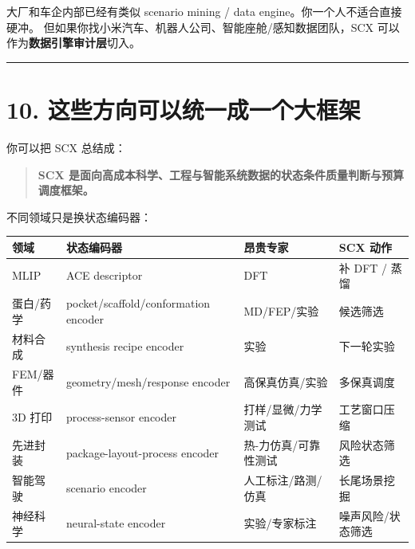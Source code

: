 \documentclass[
  12pt,
]{ctexart}
\begin{document}
大厂和车企内部已经有类似 scenario mining / data
engine。你一个人不适合直接硬冲。
但如果你找小米汽车、机器人公司、智能座舱/感知数据团队，SCX
可以作为\textbf{数据引擎审计层}切入。

\begin{center}\rule{0.5\linewidth}{0.5pt}\end{center}

\section{10.
这些方向可以统一成一个大框架}\label{ux8fd9ux4e9bux65b9ux5411ux53efux4ee5ux7edfux4e00ux6210ux4e00ux4e2aux5927ux6846ux67b6}

你可以把 SCX 总结成：

\begin{quote}
\textbf{SCX
是面向高成本科学、工程与智能系统数据的状态条件质量判断与预算调度框架。}
\end{quote}

不同领域只是换状态编码器：

\begin{longtable}[]{@{}
  >{\raggedright\arraybackslash}p{}
  >{\raggedright\arraybackslash}p{}
  >{\raggedright\arraybackslash}p{}
  >{\raggedright\arraybackslash}p{}@{}}
\toprule\noalign{}
\begin{minipage}[b]{\linewidth}\raggedright
领域
\end{minipage} & \begin{minipage}[b]{\linewidth}\raggedright
状态编码器
\end{minipage} & \begin{minipage}[b]{\linewidth}\raggedright
昂贵专家
\end{minipage} & \begin{minipage}[b]{\linewidth}\raggedright
SCX 动作
\end{minipage} \\
\midrule\noalign{}
\endhead
\bottomrule\noalign{}
\endlastfoot
MLIP & ACE descriptor & DFT & 补 DFT / 蒸馏 \\
蛋白/药学 & pocket/scaffold/conformation encoder & MD/FEP/实验 &
候选筛选 \\
材料合成 & synthesis recipe encoder & 实验 & 下一轮实验 \\
FEM/器件 & geometry/mesh/response encoder & 高保真仿真/实验 &
多保真调度 \\
3D 打印 & process-sensor encoder & 打样/显微/力学测试 & 工艺窗口压缩 \\
先进封装 & package-layout-process encoder & 热-力仿真/可靠性测试 &
风险状态筛选 \\
智能驾驶 & scenario encoder & 人工标注/路测/仿真 & 长尾场景挖掘 \\
神经科学 & neural-state encoder & 实验/专家标注 & 噪声风险/状态筛选 \\
\end{longtable}
\end{document}
